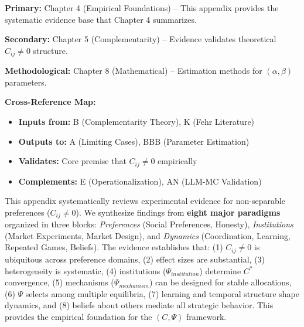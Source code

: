 
\begin{tcolorbox}[colback=gray!10!white, colframe=gray!75!black,
    title=\textbf{Chapter Linkage}]

\textbf{Primary:} Chapter 4 (Empirical Foundations) -- This appendix provides
the systematic evidence base that Chapter 4 summarizes.

\textbf{Secondary:} Chapter 5 (Complementarity) -- Evidence validates theoretical
$C_{ij} \neq 0$ structure.

\textbf{Methodological:} Chapter 8 (Mathematical) -- Estimation methods for
$(\alpha, \beta)$ parameters.

\end{tcolorbox}


\noindent\textbf{Cross-Reference Map:}
\begin{itemize}[nosep]
    \item \textbf{Inputs from:} B (Complementarity Theory), K (Fehr Literature)
    \item \textbf{Outputs to:} A (Limiting Cases), BBB (Parameter Estimation)
    \item \textbf{Validates:} Core premise that $C_{ij} \neq 0$ empirically
    \item \textbf{Complements:} E (Operationalization), AN (LLM-MC Validation)
\end{itemize}


\begin{tcolorbox}[colback=green!5!white, colframe=green!75!black,
    title=\textbf{Abstract}]

This appendix systematically reviews experimental evidence for non-separable
preferences ($C_{ij} \neq 0$). We synthesize findings from \textbf{eight major paradigms}
organized in three blocks: \emph{Preferences} (Social Preferences, Honesty),
\emph{Institutions} (Market Experiments, Market Design), and \emph{Dynamics}
(Coordination, Learning, Repeated Games, Beliefs). The evidence establishes that:
(1) $C_{ij} \neq 0$ is ubiquitous across preference domains,
(2) effect sizes are substantial,
(3) heterogeneity is systematic,
(4) institutions ($\Psi_{institution}$) determine $C^*$ convergence,
(5) mechanisms ($\Psi_{mechanism}$) can be designed for stable allocations,
(6) $\Psi$ selects among multiple equilibria,
(7) learning and temporal structure shape dynamics, and
(8) beliefs about others mediate all strategic behavior.
This provides the empirical foundation for the $(C, \Psi)$ framework.

\end{tcolorbox}

